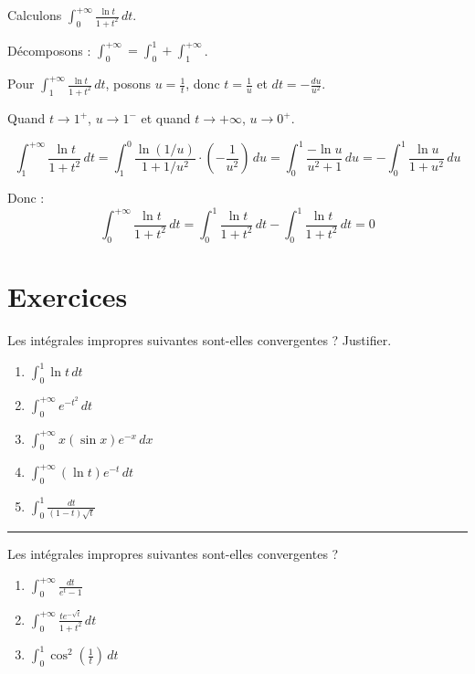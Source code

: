 \documentclass[../PolyS4.tex]{subfiles}
\begin{document}
\begin{Ex}
Calculons $\displaystyle\int_{0}^{+\infty} \frac{\ln t}{1 + t^2} \, dt$.

Décomposons : $\displaystyle\int_{0}^{+\infty} = \int_{0}^{1} + \int_{1}^{+\infty}$.

Pour $\displaystyle\int_{1}^{+\infty} \frac{\ln t}{1 + t^2} \, dt$, posons $u = \frac{1}{t}$, donc $t = \frac{1}{u}$ et $dt = -\frac{du}{u^2}$.

Quand $t \to 1^{+}$, $u \to 1^{-}$ et quand $t \to +\infty$, $u \to 0^{+}$.

$$\int_{1}^{+\infty} \frac{\ln t}{1 + t^2} \, dt = \int_{1}^{0} \frac{\ln(1/u)}{1 + 1/u^2} \cdot \left(-\frac{1}{u^2}\right) \, du = \int_{0}^{1} \frac{-\ln u}{u^2 + 1} \, du = -\int_{0}^{1} \frac{\ln u}{1 + u^2} \, du$$

Donc :
$$\int_{0}^{+\infty} \frac{\ln t}{1 + t^2} \, dt = \int_{0}^{1} \frac{\ln t}{1 + t^2} \, dt - \int_{0}^{1} \frac{\ln t}{1 + t^2} \, dt = 0$$
\end{Ex}

\newpage
\section{Exercices}


Les intégrales impropres suivantes sont-elles convergentes ? Justifier.

\begin{enumerate}
\item $\displaystyle\int_{0}^{1} \ln t \, dt$
\item $\displaystyle\int_{0}^{+\infty} e^{-t^{2}} \, dt$
\item $\displaystyle\int_{0}^{+\infty} x(\sin x) e^{-x} \, dx$
\item $\displaystyle\int_{0}^{+\infty}(\ln t) e^{-t} \, dt$
\item $\displaystyle\int_{0}^{1} \frac{dt}{(1-t) \sqrt{t}}$
\end{enumerate}

\vspace{1em}
\hrule
\vspace{1em}


Les intégrales impropres suivantes sont-elles convergentes ?

\begin{enumerate}
\item $\displaystyle\int_{0}^{+\infty} \frac{dt}{e^{t}-1}$
\item $\displaystyle\int_{0}^{+\infty} \frac{t e^{-\sqrt{t}}}{1+t^{2}} \, dt$
\item $\displaystyle\int_{0}^{1} \cos ^{2}\left(\frac{1}{t}\right) \, dt$
\end{enumerate}
\end{document}
